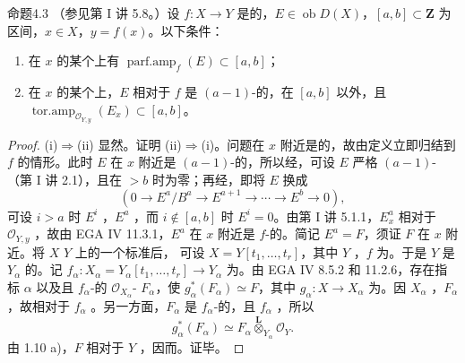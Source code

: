 \begin{SGAresult}{命题}{4.3}
（参见第 I 讲 5.8。）设 $f:X\to Y$ 是的，$E\in\operatorname{ob}D(X)$，$[a,b]\subset\mathbf Z$ 为区间，$x\in X$，$y=f(x)$。以下条件：
\begin{enumerate}
\item[(i)] 在 $x$ 的某个上有 $\operatorname{parf.amp}_f(E)\subset[a,b]$；
\item[(ii)] 在 $x$ 的某个上，$E$ 相对于 $f$ 是 $(a-1)$-的，在 $[a,b]$ 以外，且 $\operatorname{tor.amp}_{\mathcal O_{Y,y}}(E_x)\subset[a,b]$。
\end{enumerate}
\end{SGAresult}
\begin{proof}
(i)$\Rightarrow$(ii) 显然。证明 (ii)$\Rightarrow$(i)。问题在 $x$ 附近是的，故由定义立即归结到 $f$ 的情形。此时 $E$ 在 $x$ 附近是 $(a-1)$-的，所以经，可设 $E$ 严格 $(a-1)$-（第 I 讲 2.1），且在 $>b$ 时为零；再经，即将 $E$ 换成
\[
(0\longrightarrow E^a/B^a\longrightarrow E^{a+1}\longrightarrow\cdots\longrightarrow E^b\longrightarrow0),
\]
可设 $i>a$ 时 $E^i$ ，$E^a$ ，而 $i\notin[a,b]$ 时 $E^i=0$。由第 I 讲 5.1.1，$E_x^a$ 相对于 $\mathcal O_{Y,y}$ ，故由 EGA IV 11.3.1，$E^a$ 在 $x$ 附近是 $f$-的。简记 $E^a=F$，须证 $F$ 在 $x$ 附近。将 $X$  $Y$ 上的一个标准后，
可设 $X=Y[t_1,\ldots,t_r]$，其中 $Y$ ，$f$ 为。于是 $Y$ 是 $Y_\alpha$ 的。记 $f_\alpha:X_\alpha=Y_\alpha[t_1,\ldots,t_r]\to Y_\alpha$ 为。由 EGA IV 8.5.2 和 11.2.6，存在指标 $\alpha$ 以及且 $f_\alpha$-的 $\mathcal O_{X_\alpha}$- $F_\alpha$，使 $g_\alpha^*(F_\alpha)\simeq F$，其中 $g_\alpha:X\to X_\alpha$ 为。因 $X_\alpha$ ，$F_\alpha$ ，故相对于 $f_\alpha$ 。另一方面，$F_\alpha$ 是 $f_\alpha$-的，且 $f_\alpha$ ，所以
\[
g_\alpha^*(F_\alpha)\simeq F_\alpha\mathbin{\overset{\mathbf L}{\otimes}}_{Y_\alpha}\mathcal O_Y.
\]
由 1.10 a)，$F$ 相对于 $Y$ ，因而。证毕。
\end{proof}

